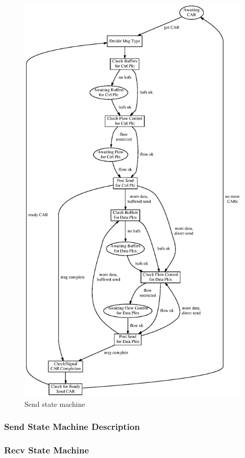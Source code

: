 \documentclass[11pt,letterpaper]{article}
\begin{document}
\begin{figure}[h]
\begin{center}
\includegraphics[height=8in]{send-sm.eps}
\caption{\label{fig:send-sm} Send state machine}
\end{center}
\end{figure}

\subsubsection{Send State Machine Description}


%
%
\subsubsection{Recv State Machine}
\end{document}
